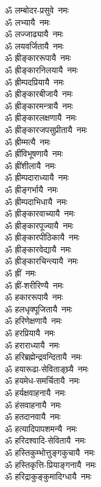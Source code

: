 \begin{multicols}{2}
\begin{flushleft}
ॐ लम्बोदर-प्रसुवे~नमः\\
ॐ लभ्यायै~नमः\\
ॐ लज्जाढ्यायै~नमः\\
ॐ लयवर्जितायै~नमः\hfill {}\\
ॐ ह्रीङ्काररूपायै~नमः\\
ॐ ह्रीङ्कारनिलयायै~नमः\\
ॐ ह्रीम्पदप्रियायै~नमः\\
ॐ ह्रीङ्कारबीजायै~नमः\\
ॐ ह्रीङ्कारमन्त्रायै~नमः\\
ॐ ह्रीङ्कारलक्षणायै~नमः\\
ॐ ह्रीङ्कारजपसुप्रीतायै~नमः\\
ॐ ह्रीम्मत्यै~नमः\\
ॐ ह्रींविभूषणायै~नमः\\
ॐ ह्रींशीलायै~नमः\hfill {}\\
ॐ ह्रीम्पदाराध्यायै~नमः\\
ॐ ह्रीङ्गर्भायै~नमः\\
ॐ ह्रीम्पदाभिधायै~नमः\\
ॐ ह्रीङ्कारवाच्यायै~नमः\\
ॐ ह्रीङ्कारपूज्यायै~नमः\\
ॐ ह्रीङ्कारपीठिकायै~नमः\\
ॐ ह्रीङ्कारवेद्यायै~नमः\\
ॐ ह्रीङ्कारचिन्त्यायै~नमः\\
ॐ ह्रीं~नमः\\
ॐ ह्रीं-शरीरिण्यै~नमः\hfill {}\\
ॐ हकाररूपायै~नमः\\
ॐ हलधृक्पूजितायै~नमः\\
ॐ हरिणेक्षणायै~नमः\\
ॐ हरप्रियायै~नमः\\
ॐ हराराध्यायै~नमः\\
ॐ हरिब्रह्मेन्द्रवन्दितायै~नमः\\
ॐ हयारूढा-सेविताङ्घ्र्यै~नमः\\
ॐ हयमेध-समर्चितायै~नमः\\
ॐ हर्यक्षवाहनायै~नमः\\
ॐ हंसवाहनायै~नमः\hfill {}\\
ॐ हतदानवायै~नमः\\
ॐ हत्यादिपापशमन्यै~नमः\\
ॐ हरिदश्वादि-सेवितायै~नमः\\
ॐ हस्तिकुम्भोत्तुङ्गकुचायै~नमः\\
ॐ हस्तिकृत्ति-प्रियाङ्गनायै~नमः\\
ॐ हरिद्राकुङ्कुमादिग्धायै~नमः\\

\end{flushleft}
\end{multicols}
